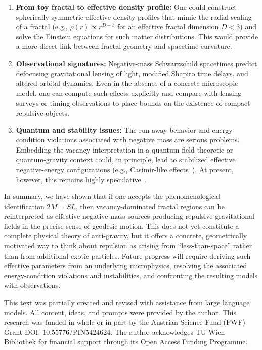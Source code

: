 \documentclass[%
  reprint,
  superscriptaddress,
  showpacs,
  showkeys,
  amsmath,amssymb,
  pra,
  longbibliography,
  floatfix,
  x11names
]{revtex4-2}
\begin{document}
\begin{enumerate}
\item \textbf{From toy fractal to effective density profile:} One could construct spherically symmetric effective density profiles that mimic the radial scaling of a fractal (e.g., \(\rho(r)\propto r^{D-3}\) for an effective fractal dimension \(D<3\)) and solve the Einstein equations for such matter distributions. This would provide a more direct link between fractal geometry and spacetime curvature.
\item \textbf{Observational signatures:} Negative-mass Schwarzschild spacetimes predict defocusing gravitational lensing of light, modified Shapiro time delays, and altered orbital dynamics. Even in the absence of a concrete microscopic model, one can compute such effects explicitly and compare with lensing surveys or timing observations to place bounds on the existence of compact repulsive objects.
\item \textbf{Quantum and stability issues:} The run-away behavior and energy-condition violations associated with negative mass are serious problems. Embedding the vacancy interpretation in a quantum-field-theoretic or quantum-gravity context could, in principle, lead to stabilized effective negative-energy configurations (e.g., Casimir-like effects~\cite{bekenstein-2013,costa-2022,kontou-2020}). At present, however, this remains highly speculative~\cite{Santiago22-PhysRevD.105.064038}.
\end{enumerate}

In summary, we have shown that if one accepts the phenomenological identification \(2M = SL\), then vacancy-dominated fractal regions can be reinterpreted as effective negative-mass sources producing repulsive gravitational fields in the precise sense of geodesic motion. This does not yet constitute a complete physical theory of anti-gravity, but it offers a concrete, geometrically motivated way to think about repulsion as arising from ``less-than-space'' rather than from additional exotic particles. Future progress will require deriving such effective parameters from an underlying microphysics, resolving the associated energy-condition violations and instabilities, and confronting the resulting models with observations.

\begin{acknowledgments}
This text was partially created and revised with assistance from large language models. All content, ideas, and prompts were provided by the author.
This research was funded in whole or in part by the Austrian Science Fund (FWF) Grant DOI: 10.55776/PIN5424624.
The author acknowledges TU Wien Bibliothek for financial support through its Open Access Funding Programme.
\end{acknowledgments}


\end{document}
